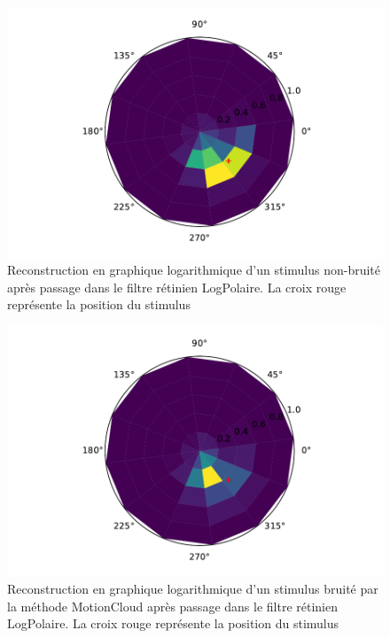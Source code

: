 \begin{figure}[th]
\centering
\includegraphics[scale=0.4]{Figures/mnist_log_nonoise}
\decoRule
\caption[Figure]{Reconstruction en graphique logarithmique d'un stimulus non-bruité après passage dans le filtre rétinien LogPolaire. La croix rouge représente la position du stimulus}
\label{fig:mnist_log_nonoise}
\end{figure}

\begin{figure}[th]
\centering
\includegraphics[scale=0.4]{Figures/mnist_log_motioncloud}
\decoRule
\caption[Figure]{Reconstruction en graphique logarithmique d'un stimulus bruité par la méthode MotionCloud après passage dans le filtre rétinien LogPolaire. La croix rouge représente la position du stimulus}
\label{fig:mnist_log_motioncloud}
\end{figure}

